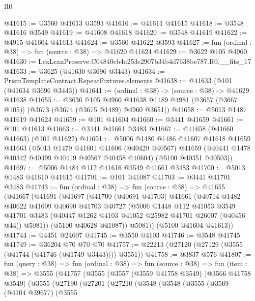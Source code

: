 \begin{lexlean}{R0}
\begin{coremodule}
@41615 := @3560 @41613 @3593
@41616 := @41611 @41615
@41618 := @3548 @41616 @3549
@41619 := @41608 @41618
@41620 := @3548 @41619
@41622 := @4915 @41604 @41613
@41624 := @3560 @41622 @3593
@41627 := fun (ordinal : @38) => fun (source : @38) => @41620 @41624
@41629 := @3622 @105 @4960
@41630 := LexLeanPreserve.C04840cb4a253e2907b34b4d7638be787.R0.__fits_17
@41633 := @3625 (@41630 @3696 @3443)
@41634 := PrismTemplateContract.RepeatFixtures.elements
@41638 := @41633 (@101 (@41634 @3696 @3443))
@41641 := (ordinal : @38) -> (source : @38) -> @41629 @41638
@41655 := @3636
    @105
    @4960
    @41638
    @1489
    @4981
    (@3657 (@3667 @105))
    (@3673 (@3674 (@3675 @1489) @4960 @3651))
@41658 := @5013 @1487 @41619 @41624
@41659 := @101 @41604
@41660 := @3441 @41659
@41661 := @101 @41613
@41663 := @3441 @41661 @3483
@41667 := @41658 (@41660 @41663) (@101 @41622)
@41691 := @5006
    @1480
    @1486
    @41607
    @41618
    @41659
    @41663
    (@5013
      @1479
      @41601
      @41606
      (@40420 @40567)
      @41659
      (@40441 @1478 @40342 @40499 @40419 @40567 @40458 @40604)
      (@5100 @40351 @40503))
@41697 := @5006 @1484 @112 @41616 @3549 @41661 @3483
@41700 := @5013 @1483 @41610 @41615
@41701 := @101 @41087
@41703 := @3441 @41701 @3483
@41743 := fun (ordinal : @38) =>
  fun (source : @38) =>
  @41655
    (@41667
      (@41691
        (@41697
          (@41700
            (@40691 @41703)
            @41661
            (@40714
              @1482
              @40622
              @41609
              @40690
              @41703
              @40727
              (@5006
                @1448
                @112
                @41053
                @3549
                @41701
                @3483
                (@40447 @1262 @4103 @41052 @25982 @41701 @26007 (@40456 @44))
                @5081))
            (@5100 @40628 @41087))
          @5081))
      (@5100 @41604 @41613))
@41744 := @4451 @24607
@41745 := @3550 @4103
@41746 := @3548 @41745
@41749 := @36204 @70 @70 @70
@41757 := @22213 (@27120 (@27129 (@3555 (@41744 (@41746 (@41749 @3443)))) @3551))
@41758 := @3837 @576
@41807 := fun (query : @38) =>
  fun (ordinal : @38) =>
  fun (source : @38) =>
  fun (item : @38) =>
  @3555
    (@41757
      (@3555
        (@3557
          (@3559 @41758 @3549)
          (@3566 @41758 @3549)
          (@3555
            (@27190
              (@27201
                (@27210
                  (@3548
                    (@3548
                      (@3555
                        (@3569
                          (@4104 @39677)
                          (@3555

\end{coremodule}
\end{lexlean}
